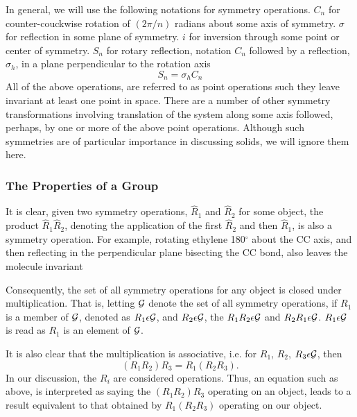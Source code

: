 \noindent
In general, we will use the following notations for symmetry 
operations.  $C_n$ for counter-couckwise rotation of $(2\pi/n)$ 
radians about some axis of symmetry. $\sigma$ for reflection in some 
plane of symmetry.  $i$ for inversion through some point or center of 
symmetry.  $S_n$ for rotary reflection, notation $C_n$ followed by a 
reflection, $\sigma_h$, in a plane perpendicular to the rotation axis
\begin{equation}
S_n = \sigma_h C_n
\end{equation}
All of the above operations, are referred to as point operations such 
they leave invariant at least one point in space.  There are a number 
of other symmetry transformations involving translation of the system 
along some axis followed, perhaps, by one or more of the above point 
operations.  Although such symmetries are of particular importance in 
discussing solids, we will ignore them here.

\subsubsection{The Properties of a Group}

It is clear, given two symmetry operations, ${\hat{R}}_1$ and 
${\hat{R}}_2$ for some object, the product ${\hat{R}}_1 
{\hat{R}}_2$, denoting the application of the first ${\hat{R}}_2$ and 
then ${\hat{R}}_1$, is also a symmetry operation.  For example, 
rotating ethylene 180$^{\circ}$ about the CC axis, and then reflecting 
in the perpendicular plane bisecting the CC bond, also leaves the 
molecule invariant

\noindent
Consequently, the set of all symmetry operations for any object is 
closed under multiplication.  That is, letting ${\cal G}$ denote the 
set of all symmetry operations, if $R_1$ is a member of ${\cal G}$, 
denoted as $R_1 \epsilon {\cal G}$, and $R_2 \epsilon {\cal G}$, the 
$R_1R_2 \epsilon {\cal G}$ and $R_2R_1 \epsilon {\cal G}$.  
$R_1\epsilon {\cal G}$ is read as $R_1$ is an element of ${\cal G}$.

It is also clear that the multiplication is associative, i.e. for 
$R_1$, $R_2$, $R_3 \epsilon {\cal G}$, then
\begin{equation}
\left( R_1 R_2 \right) R_3 = R_1 \left( R_2 R_3 \right) .
\end{equation}
In our discussion, the $R_i$ are considered operations.  Thus, an 
equation such as above, is interpreted as saying the $(R_1R_2)R_3$ 
operating on an object, leads to a result equivalent to that obtained 
by $R_1(R_2R_3)$ operating on our object.

